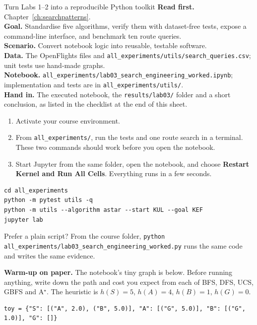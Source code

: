 
\begin{labproject}{Turn Labs 1--2 into a reproducible Python toolkit}
\textbf{Read first.} Chapter~\ref{ch:searchpatterns}.\\
\textbf{Goal.} Standardise five algorithms, verify them with dataset-free tests, expose a command-line interface, and benchmark ten route queries.\\
\textbf{Scenario.} Convert notebook logic into reusable, testable software.\\
\textbf{Data.} The OpenFlights files and \texttt{all\_experiments/utils/search\_queries.csv}; unit tests use hand-made graphs.\\
\textbf{Notebook.} \texttt{all\_experiments/lab03\_search\_engineering\_worked.ipynb}; implementation and tests are in \texttt{all\_experiments/utils/}.\\
\textbf{Hand in.} The executed notebook, the \texttt{results/lab03/} folder and a short conclusion, as listed in the checklist at the end of this sheet.
\end{labproject}

\begin{labmode}
\begin{enumerate}
  \item Activate your course environment.
  \item From \texttt{all\_experiments/}, run the tests and one route search in a terminal. These two commands should work before you open the notebook.
  \item Start Jupyter from the same folder, open the notebook, and choose \textbf{Restart Kernel and Run All Cells}. Everything runs in a few seconds.
\end{enumerate}
\begin{lstlisting}[style=utpterminal]
cd all_experiments
python -m pytest utils -q
python -m utils --algorithm astar --start KUL --goal KEF
jupyter lab
\end{lstlisting}
Prefer a plain script? From the course folder, \texttt{python all\_experiments/lab03\_search\_engineering\_worked.py} runs the same code and writes the same evidence.
\end{labmode}



\labroutine

\begin{yourturn}
\textbf{Warm-up on paper.} The notebook's tiny graph is below. Before running anything, write down the path and cost you expect from each of BFS, DFS, UCS, GBFS and A$^\star$. The heuristic is $h(S)=5$, $h(A)=4$, $h(B)=1$, $h(G)=0$.
\begin{lstlisting}[style=utppython]
toy = {"S": [("A", 2.0), ("B", 5.0)], "A": [("G", 5.0)], "B": [("G", 1.0)], "G": []}
\end{lstlisting}
\end{yourturn}

